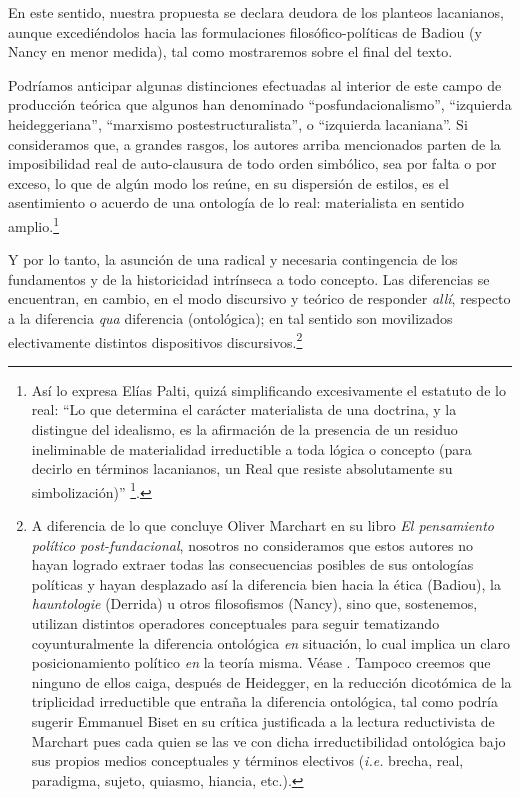 En este sentido, nuestra propuesta se declara deudora de los planteos lacanianos, aunque excediéndolos hacia las formulaciones filosófico-políticas de Badiou (y Nancy en menor medida), tal como mostraremos sobre el final del texto.

Podríamos anticipar algunas distinciones efectuadas al interior de este campo de producción teórica que algunos han denominado \enquote{posfundacionalismo}, \enquote{izquierda heideggeriana}, \enquote{marxismo postestructuralista}, o \enquote{izquierda lacaniana}. Si consideramos que, a grandes rasgos, los autores arriba mencionados parten de la imposibilidad real de auto-clausura de todo orden simbólico, sea por falta o por exceso, lo que de algún modo los reúne, en su dispersión de estilos, es el asentimiento o acuerdo de una ontología de lo real: materialista en sentido amplio.\footnote{Así lo expresa Elías Palti, quizá simplificando excesivamente el estatuto de lo real: \enquote{Lo que determina el carácter materialista de una doctrina, y la distingue del idealismo, es la afirmación de la presencia de un residuo ineliminable de materialidad irreductible a toda lógica o concepto (para decirlo en términos lacanianos, un Real que resiste absolutamente su simbolización)} \footcite[90]{@7008-ELIAS2005}.}

Y por lo tanto, la asunción de una radical y necesaria contingencia de los fundamentos y de la historicidad intrínseca a todo concepto. Las diferencias se encuentran, en cambio, en el modo discursivo y teórico de responder \emph{allí}, respecto a la diferencia \emph{qua} diferencia (ontológica); en tal sentido son movilizados electivamente distintos dispositivos discursivos.\footnote{A diferencia de lo que concluye Oliver Marchart en su libro \emph{El pensamiento político post-fundacional}, nosotros no consideramos que estos autores no hayan logrado extraer todas las consecuencias posibles de sus ontologías políticas y hayan desplazado así la diferencia bien hacia la ética (Badiou), la \emph{hauntologie} (Derrida) u otros filosofismos (Nancy), sino que, sostenemos, utilizan distintos operadores conceptuales para seguir tematizando coyunturalmente la diferencia ontológica \emph{en} situación, lo cual implica un claro posicionamiento político \emph{en} la teoría misma. Véase \cite[31]{@6998-MARCHART2009}. Tampoco creemos que ninguno de ellos caiga, después de Heidegger, en la reducción dicotómica de la triplicidad irreductible que entraña la diferencia ontológica, tal como podría sugerir Emmanuel Biset en su crítica justificada a la lectura reductivista de Marchart \parencite[]{@7074-BISET2010} pues cada quien se las ve con dicha irreductibilidad ontológica bajo sus propios medios conceptuales y términos electivos (\emph{i.e.} brecha, real, paradigma, sujeto, quiasmo, hiancia, etc.).}




